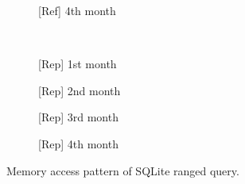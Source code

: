 \begin{figure}[t]
\begin{subfigure}[b]{.24\linewidth}
        \caption{[Ref] 4th month}
        \label{fig:13:ref:side-channel-sqlite-month4}
    \end{subfigure}
    \\
    \begin{subfigure}[b]{.24\linewidth}
        \centering
        \caption{[Rep] 1st month}
        \label{fig:13:rep:side-channel-sqlite-month1}
    \end{subfigure}
    \hfill
    \begin{subfigure}[b]{.24\linewidth}
        \centering
        \caption{[Rep] 2nd month}
        \label{fig:13:rep:side-channel-sqlite-month2}
    \end{subfigure}
    \hfill
    \begin{subfigure}[b]{.24\linewidth}
        \centering
        \caption{[Rep] 3rd month}
        \label{fig:13:rep:side-channel-sqlite-month3}
    \end{subfigure}
    \hfill
    \begin{subfigure}[b]{.24\linewidth}
        \centering
        \caption{[Rep] 4th month}
        \label{fig:13:rep:side-channel-sqlite-month4}
    \end{subfigure}
    \caption{Memory access pattern of SQLite ranged query.}
    \label{fig:13:side-channel-sqlite-ranged-month}

\end{figure}
